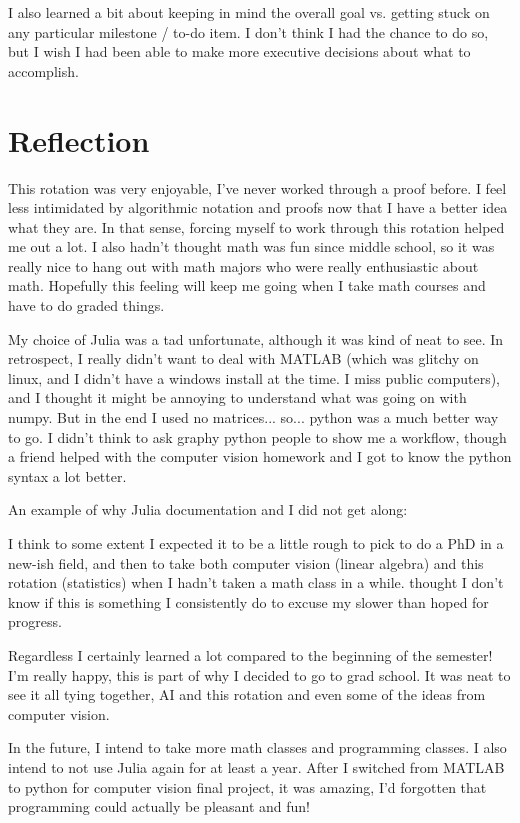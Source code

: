 \documentclass[a4paper]{article}
\begin{document}
I also learned a bit about keeping in mind the overall goal vs. getting stuck on
any particular milestone / to-do item. I don't think I had the chance to do so,
but I wish I had been able to make more executive decisions about what to
accomplish. 

\section{Reflection}

This rotation was very enjoyable, I've never worked through a proof before. I
feel less intimidated by algorithmic notation and proofs now that I have a
better idea what they are. In that sense, forcing myself to work through this
rotation helped me out a lot. I also hadn't thought math was fun since middle
school, so it was really nice to hang out with math majors who were really
enthusiastic about math. Hopefully this feeling will keep me going when I take
math courses and have to do graded things.

My choice of Julia was a tad unfortunate, although it was kind of neat to see.
In retrospect, I really didn't want to deal with MATLAB (which was glitchy on
linux, and I didn't have a windows install at the time. I miss public
computers), and I thought it might be annoying to understand what was going on
with numpy. But in the end I used no matrices... so... python was a much better
way to go. I didn't think to ask graphy python people to show me a workflow,
though a friend helped with the computer vision homework and I got to know the
python syntax a lot better.

An example of why Julia documentation and I did not get along:

I think to some extent I expected it to be a little rough to pick to do a PhD in a new-ish
field, and then to take both computer vision (linear algebra) and this rotation
(statistics) when I hadn't taken a math class in a while. thought I don't know if this
is something I consistently do to excuse my slower than hoped for progress.

Regardless I certainly learned a lot compared to the beginning of the semester!
I'm really happy, this is part of why I decided to go to grad school. It was
neat to see it all tying together, AI and this rotation and even some of the
ideas from computer vision.

In the future, I intend to take more math classes and programming classes. I
also intend to not use Julia again for at least a year. After I switched from
MATLAB to python for computer vision final project, it was amazing, I'd
forgotten that programming could actually be pleasant and fun!
\end{document}

